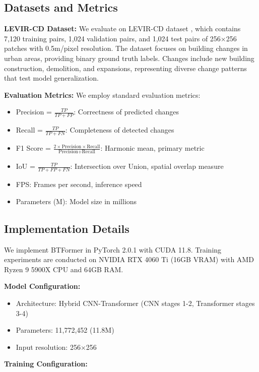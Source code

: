 \documentclass[journal]{IEEEtran}
\begin{document}
\subsection{Datasets and Metrics}

\textbf{LEVIR-CD Dataset:} We evaluate on LEVIR-CD dataset \cite{changeforemer}, which contains 7,120 training pairs, 1,024 validation pairs, and 1,024 test pairs of 256$\times$256 patches with 0.5m/pixel resolution. The dataset focuses on building changes in urban areas, providing binary ground truth labels. Changes include new building construction, demolition, and expansions, representing diverse change patterns that test model generalization.

\textbf{Evaluation Metrics:} We employ standard evaluation metrics:
\begin{itemize}
\item Precision = $\frac{TP}{TP + FP}$: Correctness of predicted changes
\item Recall = $\frac{TP}{TP + FN}$: Completeness of detected changes
\item F1 Score = $\frac{2 \times \text{Precision} \times \text{Recall}}{\text{Precision} + \text{Recall}}$: Harmonic mean, primary metric
\item IoU = $\frac{TP}{TP + FP + FN}$: Intersection over Union, spatial overlap measure
\item FPS: Frames per second, inference speed
\item Parameters (M): Model size in millions
\end{itemize}

\subsection{Implementation Details}

We implement BTFormer in PyTorch 2.0.1 with CUDA 11.8. Training experiments are conducted on NVIDIA RTX 4060 Ti (16GB VRAM) with AMD Ryzen 9 5900X CPU and 64GB RAM.

\textbf{Model Configuration:}
\begin{itemize}
\item Architecture: Hybrid CNN-Transformer (CNN stages 1-2, Transformer stages 3-4)
\item Parameters: 11,772,452 (11.8M)
\item Input resolution: 256$\times$256
\end{itemize}

\textbf{Training Configuration:}
\end{document}
